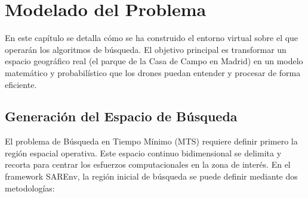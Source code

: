 \chapter{Modelado del Problema}
\label{cap:modelado}

En este capítulo se detalla cómo se ha construido el entorno virtual sobre el que operarán los algoritmos de búsqueda. El objetivo principal es transformar un espacio geográfico real (el parque de la Casa de Campo en Madrid) en un modelo matemático y probabilístico que los drones puedan entender y procesar de forma eficiente.

\section{Generación del Espacio de Búsqueda}

El problema de Búsqueda en Tiempo Mínimo (MTS) requiere definir primero la región espacial operativa. Este espacio continuo bidimensional se delimita y recorta para centrar los esfuerzos computacionales en la zona de interés. En el framework SAREnv, la región inicial de búsqueda se puede definir mediante dos metodologías:

